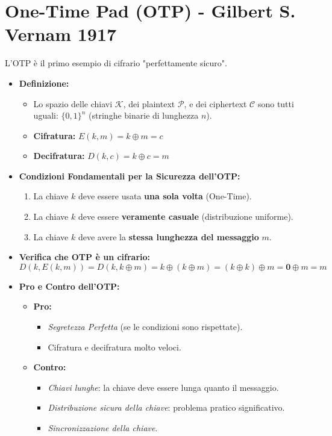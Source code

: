 \documentclass{article}
\begin{document}
\section{One-Time Pad (OTP) - Gilbert S. Vernam 1917}
L'OTP è il primo esempio di cifrario "perfettamente sicuro".
\begin{itemize}
    \item \textbf{Definizione:}
    \begin{itemize}
        \item Lo spazio delle chiavi $\mathcal{K}$, dei plaintext $\mathcal{P}$, e dei ciphertext $\mathcal{C}$ sono tutti uguali: $\{0,1\}^n$ (stringhe binarie di lunghezza $n$).
        \item \textbf{Cifratura:} $E(k, m) = k \oplus m = c$
        \item \textbf{Decifratura:} $D(k, c) = k \oplus c = m$
    \end{itemize}
    \item \textbf{Condizioni Fondamentali per la Sicurezza dell'OTP:}
    \begin{enumerate}
        \item La chiave $k$ deve essere usata \textbf{una sola volta} (One-Time).
        \item La chiave $k$ deve essere \textbf{veramente casuale} (distribuzione uniforme).
        \item La chiave $k$ deve avere la \textbf{stessa lunghezza del messaggio} $m$.
    \end{enumerate}
    \item \textbf{Verifica che OTP è un cifrario:}
    \[ D(k, E(k,m)) = D(k, k \oplus m) = k \oplus (k \oplus m) = (k \oplus k) \oplus m = \mathbf{0} \oplus m = m \]
    \item \textbf{Pro e Contro dell'OTP:}
    \begin{itemize}
        \item \textbf{Pro:}
        \begin{itemize}
            \item \textit{Segretezza Perfetta} (se le condizioni sono rispettate).
            \item Cifratura e decifratura molto veloci.
        \end{itemize}
        \item \textbf{Contro:}
        \begin{itemize}
            \item \textit{Chiavi lunghe}: la chiave deve essere lunga quanto il messaggio.
            \item \textit{Distribuzione sicura della chiave}: problema pratico significativo.
            \item \textit{Sincronizzazione della chiave}.
        \end{itemize}
    \end{itemize}
\end{itemize}
\end{document}
